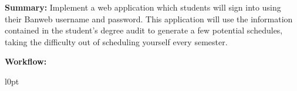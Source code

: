 \documentclass[10pt]{article}
\begin{document}
\textbf{Summary:} Implement a web application which students will sign
into using their Banweb username and password. This application will use the
information contained in the student's degree audit to generate a few potential
schedules, taking the difficulty out of scheduling yourself every semester.

\textbf{Workflow:}
\begin{wrapfigure}{l}{0pt}
  \begin{tikzpicture}
  \end{tikzpicture}
\end{wrapfigure}
\end{document}
